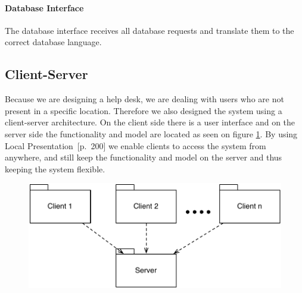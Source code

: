 \paragraph{Database Interface}
The database interface receives all database requests and translate them to the correct database language.

 



\subsection{Client-Server}
Because we are designing a help desk, we are dealing with users who are not present in a specific location. Therefore we also designed the system using a client-server architecture.
On the client side there is a user interface and on the server side the functionality and model are located as seen on figure \ref{fig:client-server}. By using Local Presentation~\cite{roedeaalborg}[p.~200] we enable clients to access the system from anywhere, and still keep the functionality and model on the server and thus keeping the system flexible.         


\begin{figure}%
\centering
	\includegraphics[scale=0.5]{input/architectural_design/client-server-architecture-pattern.pdf}%
	\morscaption{}
	\label{fig:client-server}%
\end{figure}